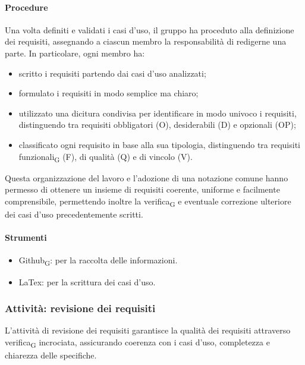 \documentclass[11pt,a4paper]{article}
\newcommand{\gls}[1]{#1\textsubscript{G}}
\begin{document}
\paragraph{Procedure}
Una volta definiti e validati i casi d’uso, il gruppo ha proceduto alla definizione dei requisiti, assegnando a ciascun membro la responsabilità di redigerne una parte. In particolare, ogni membro ha:
\begin{itemize}
\item scritto i requisiti partendo dai casi d’uso analizzati;
\item formulato i requisiti in modo semplice ma chiaro;
\item utilizzato una dicitura condivisa per identificare in modo univoco i requisiti, distinguendo tra requisiti obbligatori (O), desiderabili (D) e opzionali (OP);
\item classificato ogni requisito in base alla sua tipologia, distinguendo tra \gls{requisiti funzionali} (F), di qualità (Q) e di vincolo (V).
\end{itemize}
Questa organizzazione del lavoro e l’adozione di una notazione comune hanno permesso di ottenere un insieme di requisiti coerente, uniforme e facilmente comprensibile, permettendo inoltre la \gls{verifica} e eventuale correzione ulteriore dei casi d’uso precedentemente scritti.

\paragraph{Strumenti}
\begin{itemize}
\item \gls{Github}: per la raccolta delle informazioni.
\item LaTex: per la scrittura dei casi d'uso.
\end{itemize}

\subsubsection{Attività: revisione dei requisiti}
L’attività di revisione dei requisiti garantisce la qualità dei requisiti attraverso \gls{verifica} incrociata, assicurando coerenza con i casi d’uso, completezza e chiarezza delle specifiche.
\end{document}
